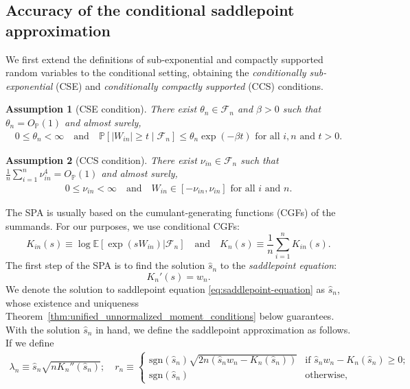 \documentclass[12pt]{article}
\newtheorem{assumption}{Assumption}
\theoremstyle{definition}
\def\P{\mathbb{P}}
\def\sgn{\mathrm{sgn}}
\def\P{\mathbb{P}}
\newcommand{\E}{\mathbb E}								%
\renewcommand{\P}{\mathbb{P}}							%
\begin{document}
  \subsection{Accuracy of the conditional saddlepoint approximation} \label{sec:main-results-spa}
  
  We first extend the definitions of sub-exponential and compactly supported random variables to the conditional setting, obtaining the \textit{conditionally sub-exponential} (CSE) and \textit{conditionally compactly supported} (CCS) conditions. 
  \begin{assumption}[CSE condition]\label{assu:cse}
  There exist $\theta_n \in \mathcal F_n$ and $\beta > 0$ such that $\theta_n=O_{\P}(1)$ and almost surely, 
  \begin{align*}
    0\leq \theta_n < \infty\quad\text{and}\quad\P[|W_{in}|\geq t\mid \mathcal{F}_n]\leq \theta_n\exp(-\beta t)\text{ for all $i,n$ and $t>0$}.
  \end{align*}
  \end{assumption}
  \begin{assumption}[CCS condition]\label{assu:ccs}
  There exist $\nu_{in} \in \mathcal F_n$ such that $\frac{1}{n}\sum_{i=1}^n \nu_{in}^4=O_{\P}(1)$ and almost surely, 
  \begin{align*}
    0\leq \nu_{in}<\infty\quad\text{and}\quad W_{in}\in[-\nu_{in},\nu_{in}]\text{ for all $i$ and $n$}.
  \end{align*}
  \end{assumption}
  The SPA is usually based on the cumulant-generating functions (CGFs) of the summands. For our purposes, we use conditional CGFs:
  \begin{equation}\label{eq:CCGF_def}
  K_{in}(s) \equiv \log \E[\exp(sW_{in})|\mathcal F_n] \quad \text{and} \quad K_n(s) \equiv \frac{1}{n}\sum_{i = 1}^n K_{in}(s).
  \end{equation}
  The first step of the SPA is to find the solution $\hat s_n$ to the \textit{saddlepoint equation}:
  \begin{equation}\label{eq:saddlepoint-equation}
  K_n'(s) = w_n.
  \end{equation}
  We denote the solution to saddlepoint equation \eqref{eq:saddlepoint-equation} as $\hat s_n$, whose existence and uniqueness Theorem~\ref{thm:unified_unnormalized_moment_conditions} below guarantees. With the solution $\hat s_n$ in hand, we define the saddlepoint approximation as follows. If we define
  \small
  \begin{align}\label{eq:lam_n_r_n_def}
	\lambda_n \equiv \hat s_n\sqrt{nK_n''(\hat s_n)}; \quad r_n \equiv
	\begin{cases}
	  \sgn(\hat s_n) \sqrt{2n( \hat s_n w_n - K_n(\hat s_n))} & \text{if } \hat s_n w_n - K_n(\hat s_n)\geq 0;\\
	  \mathrm{sgn}(\hat s_n) & \text{otherwise},
	\end{cases}
	\end{align}
\end{document}
